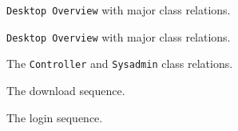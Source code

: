 
\begin{figure}[h!]
	\caption{\texttt{Desktop Overview} with major class relations.}
	\label{fig:des_overview}
\end{figure}
\newpage
\begin{figure}[h!]
	\caption{\texttt{Desktop Overview} with major class relations.}
	\label{fig:des_overview2}
\end{figure}
\newpage

\begin{figure}[h!]
	\caption{The \texttt{Controller} and \texttt{Sysadmin} class relations.}
	\label{fig:des_sysadmin}
\end{figure}

\newpage
\begin{figure}[h!]
	\caption{The download sequence.}
	\label{fig:des_sequence_download}
\end{figure}
\newpage
\begin{figure}[h!]
	\caption{The login sequence.}
	\label{fig:des_sequence_login}
\end{figure}
\newpage